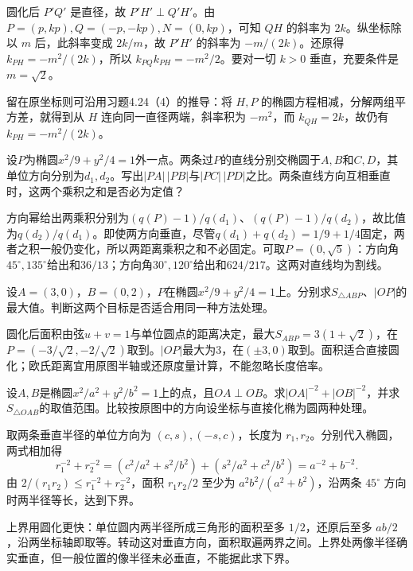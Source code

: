 圆化后 \(P'Q'\) 是直径，故 \(P'H'\perp Q'H'\)。由 \(P=(p,kp),Q=(-p,-kp),N=(0,kp)\)，可知 \(QH\) 的斜率为 \(2k\)。纵坐标除以 \(m\) 后，此斜率变成 \(2k/m\)，故 \(P'H'\) 的斜率为 \(-m/(2k)\)。还原得 \(k_{PH}=-m^2/(2k)\)，所以 \(k_{PQ}k_{PH}=-m^2/2\)。要对一切 \(k>0\) 垂直，充要条件是 \(m=\sqrt2\)。

留在原坐标则可沿用习题4.24（4）的推导：将 \(H,P\) 的椭圆方程相减，分解两组平方差，就得到从 \(H\) 连向同一直径两端，斜率积为 \(-m^2\)，而 \(k_{QH}=2k\)，故仍有 \(k_{PH}=-m^2/(2k)\)。


设\(P\)为椭圆\(x^2/9+y^2/4=1\)外一点。两条过\(P\)的直线分别交椭圆于\(A,B\)和\(C,D\)，其单位方向分别为\(d_1,d_2\)。写出\(|PA|\,|PB|\)与\(|PC|\,|PD|\)之比。两条直线方向互相垂直时，这两个乘积之和是否必为定值？
\par
\solutionanswer
方向幂给出两乘积分别为\((q(P)-1)/q(d_1)\)、\((q(P)-1)/q(d_2)\)，故比值为\(q(d_2)/q(d_1)\)。即使两方向垂直，尽管\(q(d_1)+q(d_2)=1/9+1/4\)固定，两者之积一般仍变化，所以两距离乘积之和不必固定。可取\(P=(0,\sqrt5)\)：方向角\(45^\circ,135^\circ\)给出和\(36/13\)；方向角\(30^\circ,120^\circ\)给出和\(624/217\)。这两对直线均为割线。


设\(A=(3,0)\)，\(B=(0,2)\)，\(P\)在椭圆\(x^2/9+y^2/4=1\)上。分别求\(S_{\triangle ABP}\)、\(|OP|\)的最大值。判断这两个目标是否适合用同一种方法处理。
\par
\solutionanswer
圆化后面积由弦\(u+v=1\)与单位圆点的距离决定，最大\(S_{ABP}=3(1+\sqrt2)\)，在\(P=(-3/\sqrt2,-2/\sqrt2)\)取到。\(|OP|\)最大为\(3\)，在\((\pm3,0)\)取到。面积适合直接圆化；欧氏距离宜用原图半轴或还原度量计算，不能忽略长度倍率。


设\(A,B\)是椭圆\(x^2/a^2+y^2/b^2=1\)上的点，且\(OA\perp OB\)。求\(|OA|^{-2}+|OB|^{-2}\)，并求\(S_{\triangle OAB}\)的取值范围。比较按原图中的方向设坐标与直接化椭为圆两种处理。
\par
\solutionanswer
取两条垂直半径的单位方向为 \((c,s),(-s,c)\)，长度为 \(r_1,r_2\)。分别代入椭圆，两式相加得
\[
 r_1^{-2}+r_2^{-2}=(c^2/a^2+s^2/b^2)+(s^2/a^2+c^2/b^2)=a^{-2}+b^{-2}.
\]
由 \(2/(r_1r_2)\le r_1^{-2}+r_2^{-2}\)，面积 \(r_1r_2/2\) 至少为 \(a^2b^2/(a^2+b^2)\)，沿两条 \(45^\circ\) 方向时两半径等长，达到下界。

上界用圆化更快：单位圆内两半径所成三角形的面积至多 \(1/2\)，还原后至多 \(ab/2\)，沿两坐标轴即取等。转动这对垂直方向，面积取遍两界之间。上界处两像半径确实垂直，但一般位置的像半径未必垂直，不能据此求下界。



